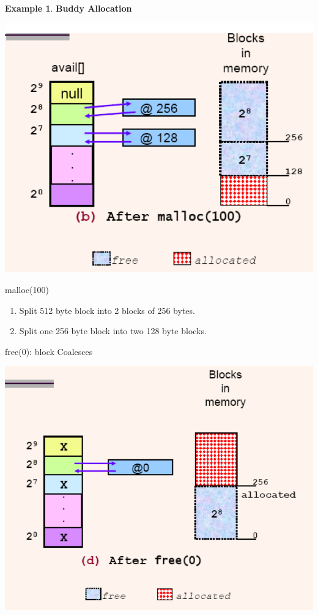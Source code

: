 \documentclass[11pt,a4paper]{article}
\theoremstyle{definition}
\newtheorem{example}{Example}[section]
\newenvironment{myenumerate}
{ \begin{enumerate}
    \setlength{\itemsep}{5pt}
    \setlength{\parskip}{0pt}
    \setlength{\parsep}{0pt}     }
{ \end{enumerate}                }
\begin{document}
\begin{example}{\textbf{Buddy Allocation}}

\begin{minipage}{0.3\linewidth}
	\includegraphics[width=\linewidth]{m4/buddyAllocation2}
\end{minipage}
\begin{minipage}{0.3\linewidth}
	\textsf{malloc(100)}
	
	\begin{myenumerate}
		\item Split 512 byte block into 2 blocks of 256 bytes.
		\item Split one 256 byte block into two 128 byte blocks.
	\end{myenumerate}
	
	\textsf{free(0)}: block Coalesces
\end{minipage}
\begin{minipage}{0.3\linewidth}
	\includegraphics[width=\linewidth]{m4/buddyAllocation3}
\end{minipage}

	
\end{example}
\end{document}
